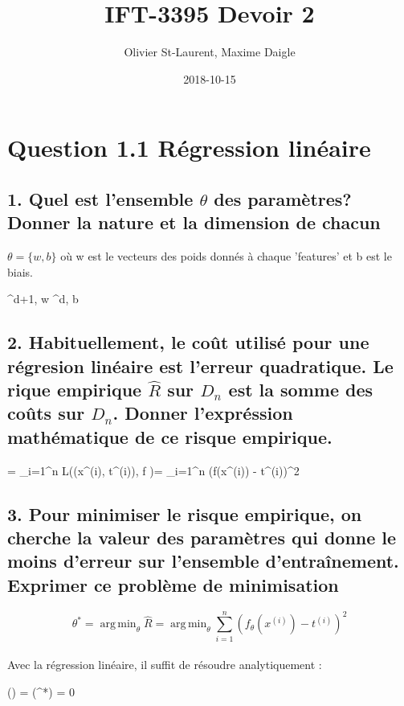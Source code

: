 \documentclass[12pt]{article}
\author{Olivier St-Laurent, Maxime Daigle}
\title{IFT-3395  Devoir 2}
\date{2018-10-15}
\DeclareMathOperator*{\argmin}{arg\,min}
\newenvironment{eqs*}{\begin{equation*}\begin{aligned}}{\end{aligned}\end{equation*}}
\begin{document}
\maketitle

\section{Question 1.1 Régression linéaire}

\subsection{1. Quel est l'ensemble $\theta$ des paramètres? Donner la nature et la dimension de chacun}

	$\theta = \{ w, b\}$ où w est le vecteurs des poids donnés à chaque 'features' et b est le biais. 
	\begin{eqs*}
		\theta \in {}^{d+1}, w \in {}^{d}, b \in {}
	\end{eqs*}

\subsection{2. Habituellement, le coût utilisé pour une régresion linéaire est l'erreur quadratique. Le rique empirique $\hat{R}$ sur $D_{n}$ est la somme
des coûts sur $D_{n}$. Donner l'expréssion mathématique de ce risque empirique.}
	
	\begin{eqs*}	
		 = \sum_{i=1}^{n} L((x^{(i)}, t^{(i)}), f )= \sum_{i=1}^{n} (f(x^{(i)}) - t^{(i)})^{2}
	\end{eqs*}

\subsection{3. Pour minimiser le risque empirique, on cherche la valeur des paramètres qui donne le moins d'erreur sur l'ensemble d'entraînement.
Exprimer ce problème de minimisation}

	\[\theta^{*} = \argmin_{\theta} \hat{R} = \argmin_{\theta} \sum_{i=1}^{n} (f_{\theta}(x^{(i)}) - t^{(i)})^{2}\] \\
	Avec la régression linéaire, il suffit de résoudre analytiquement :	
	\begin{eqs*}	
		\nabla {}(\theta) = (\theta^{*}) = 0
	\end{eqs*}
\end{document}
